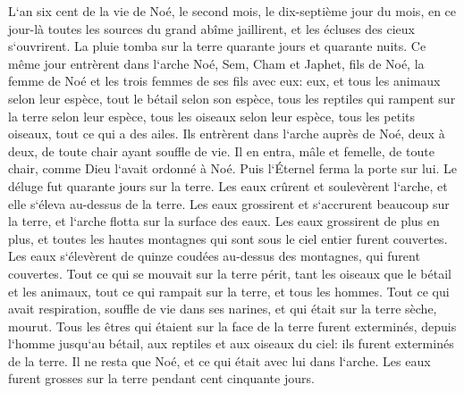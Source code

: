 \verse L`an six cent de la vie de Noé, le second mois, le dix-septième jour du mois, en ce jour-là toutes les sources du grand abîme jaillirent, et les écluses des cieux s`ouvrirent. 
\verse La pluie tomba sur la terre quarante jours et quarante nuits. 
\verse Ce même jour entrèrent dans l`arche Noé, Sem, Cham et Japhet, fils de Noé, la femme de Noé et les trois femmes de ses fils avec eux: 
\verse eux, et tous les animaux selon leur espèce, tout le bétail selon son espèce, tous les reptiles qui rampent sur la terre selon leur espèce, tous les oiseaux selon leur espèce, tous les petits oiseaux, tout ce qui a des ailes. 
\verse Ils entrèrent dans l`arche auprès de Noé, deux à deux, de toute chair ayant souffle de vie. 
\verse Il en entra, mâle et femelle, de toute chair, comme Dieu l`avait ordonné à Noé. Puis l`Éternel ferma la porte sur lui. 
\verse Le déluge fut quarante jours sur la terre. Les eaux crûrent et soulevèrent l`arche, et elle s`éleva au-dessus de la terre. 
\verse Les eaux grossirent et s`accrurent beaucoup sur la terre, et l`arche flotta sur la surface des eaux. 
\verse Les eaux grossirent de plus en plus, et toutes les hautes montagnes qui sont sous le ciel entier furent couvertes. 
\verse Les eaux s`élevèrent de quinze coudées au-dessus des montagnes, qui furent couvertes. 
\verse Tout ce qui se mouvait sur la terre périt, tant les oiseaux que le bétail et les animaux, tout ce qui rampait sur la terre, et tous les hommes. 
\verse Tout ce qui avait respiration, souffle de vie dans ses narines, et qui était sur la terre sèche, mourut. 
\verse Tous les êtres qui étaient sur la face de la terre furent exterminés, depuis l`homme jusqu`au bétail, aux reptiles et aux oiseaux du ciel: ils furent exterminés de la terre. Il ne resta que Noé, et ce qui était avec lui dans l`arche. 
\verse Les eaux furent grosses sur la terre pendant cent cinquante jours. 

